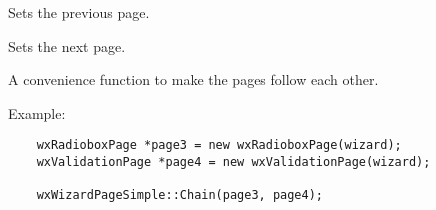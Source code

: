 \label{wxwizardpagesimplesetprev}


Sets the previous page.

\label{wxwizardpagesimplesetnext}


Sets the next page.

\label{wxwizardpagesimplechain}


A convenience function to make the pages follow each other.

Example:
\begin{verbatim}
    wxRadioboxPage *page3 = new wxRadioboxPage(wizard);
    wxValidationPage *page4 = new wxValidationPage(wizard);

    wxWizardPageSimple::Chain(page3, page4);
\end{verbatim}

